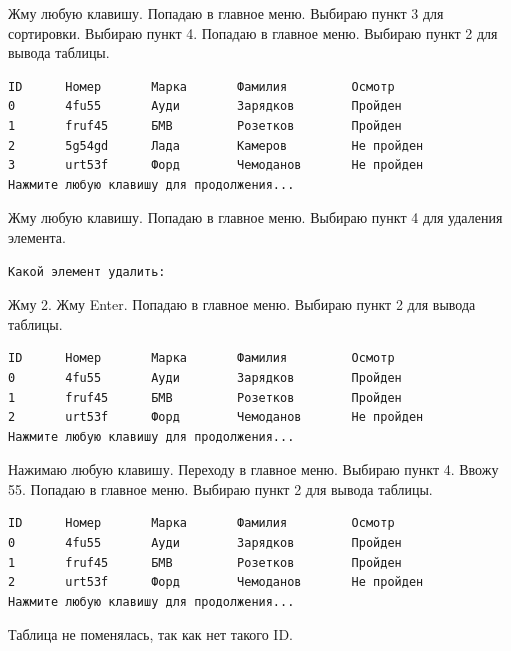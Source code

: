 \documentclass[12pt, a4paper]{article}
\begin{document}
Жму любую клавишу. Попадаю в главное меню. Выбираю пункт 3 для сортировки. Выбираю пункт 4. Попадаю в главное меню. Выбираю пункт 2 для вывода таблицы.

\begin{tcolorbox}
\begin{verbatim}
ID      Номер       Марка       Фамилия         Осмотр
0       4fu55       Ауди        Зарядков        Пройден   
1       fruf45      БМВ         Розетков        Пройден   
2       5g54gd      Лада        Камеров         Не пройден        
3       urt53f      Форд        Чемоданов       Не пройден
Нажмите любую клавишу для продолжения...
\end{verbatim}
\end{tcolorbox}

Жму любую клавишу. Попадаю в главное меню. Выбираю пункт 4 для удаления элемента.

\begin{tcolorbox}
\begin{verbatim}
Какой элемент удалить:
\end{verbatim}
\end{tcolorbox}

Жму 2. Жму Enter. Попадаю в главное меню. Выбираю пункт 2 для вывода таблицы.

\begin{tcolorbox}
\begin{verbatim}
ID      Номер       Марка       Фамилия         Осмотр
0       4fu55       Ауди        Зарядков        Пройден
1       fruf45      БМВ         Розетков        Пройден
2       urt53f      Форд        Чемоданов       Не пройден
Нажмите любую клавишу для продолжения...
\end{verbatim}
\end{tcolorbox}

Нажимаю любую клавишу. Переходу в главное меню. Выбираю пункт 4. Ввожу 55. Попадаю в главное меню. Выбираю пункт 2 для вывода таблицы.

\begin{tcolorbox}
\begin{verbatim}
ID      Номер       Марка       Фамилия         Осмотр
0       4fu55       Ауди        Зарядков        Пройден
1       fruf45      БМВ         Розетков        Пройден
2       urt53f      Форд        Чемоданов       Не пройден
Нажмите любую клавишу для продолжения...
\end{verbatim}
\end{tcolorbox}

Таблица не поменялась, так как нет такого ID.
\end{document}
